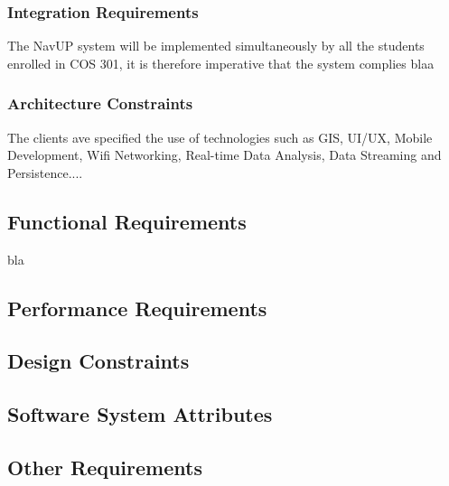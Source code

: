 \documentclass[12pt,a4paper]{report}
\begin{document}
			\subsubsection{Integration Requirements}
				The NavUP system will be implemented simultaneously by all the students enrolled in COS 301, it is therefore imperative that the system complies blaa %
			\subsubsection{Architecture Constraints}
				The clients ave specified the use of technologies such as GIS, UI/UX, Mobile Development, Wifi Networking, Real-time Data Analysis, Data Streaming and
				Persistence....
		
	\subsection*{Functional Requirements}
		bla
		
	\subsection*{Performance Requirements}
	\subsection*{Design Constraints}
	\subsection*{Software System Attributes}
    \subsection*{Other Requirements}
\end{document}
